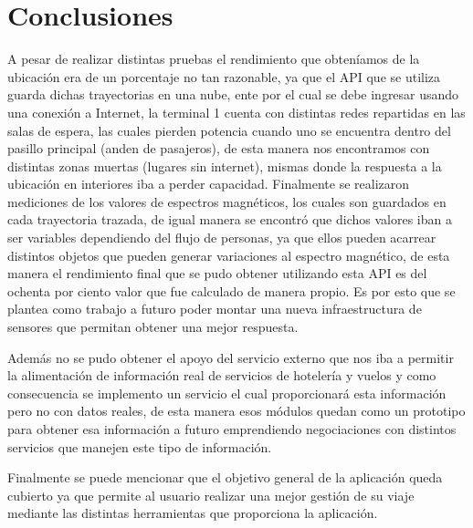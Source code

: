 \chapter*{Conclusiones}


A pesar de realizar distintas pruebas el rendimiento que obteníamos de la ubicación era de un porcentaje no tan razonable, ya que el API que se utiliza guarda dichas trayectorias en una nube, ente por el cual se debe ingresar usando una conexión a Internet, la terminal 1 cuenta con distintas redes repartidas en las salas de espera, las cuales pierden potencia cuando uno se encuentra dentro del pasillo principal (anden de pasajeros), de esta manera nos encontramos con distintas zonas muertas (lugares sin internet), mismas donde la respuesta a la ubicación en interiores iba a perder capacidad. Finalmente se realizaron mediciones de los valores de espectros magnéticos, los cuales son guardados en cada trayectoria trazada, de igual manera se encontró que dichos valores iban a ser variables dependiendo del flujo de personas, ya que ellos pueden acarrear distintos objetos que pueden generar variaciones al espectro magnético, de esta manera el rendimiento final que se pudo obtener utilizando esta API es del ochenta por ciento valor que fue calculado de manera propio. Es por esto que se plantea como trabajo a futuro poder montar una nueva infraestructura de sensores que permitan obtener una mejor respuesta. 

Además no se pudo obtener el apoyo del servicio externo que nos iba a permitir la alimentación de información real de servicios de hotelería y vuelos y como consecuencia se implemento un servicio el cual proporcionará esta información pero no con datos reales, de esta manera esos módulos quedan como un prototipo para obtener esa información a futuro emprendiendo negociaciones con distintos servicios que manejen este tipo de información.  

Finalmente se puede mencionar que el objetivo general de la aplicación queda cubierto ya que permite al usuario realizar una mejor gestión de su viaje mediante las distintas herramientas que proporciona la aplicación.